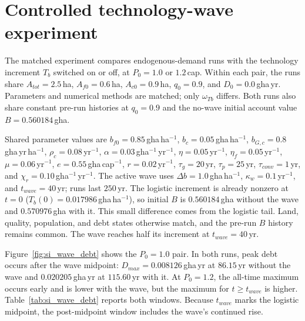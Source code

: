 \documentclass[11pt,a4paper]{article}
\begin{document}
\section{Controlled technology-wave experiment}\label{si:tbwave}

The matched experiment compares endogenous-demand runs with the technology increment $T_b$ switched on or off, at $P_0=1.0$ or $1.2$\,cap. Within each pair, the runs share $A_{tot}=2.5$\,ha, $A_{f0}=0.6$\,ha, $A_{c0}=0.9$\,ha, $q_0=0.9$, and $D_0=0.0$\,gha\,yr. Parameters and numerical methods are matched; only $\omega_{Tb}$ differs. Both runs also share constant pre-run histories at $q_0=0.9$ and the no-wave initial account value $B=0.560184$\,gha.

Shared parameter values are $b_{f0}=0.85$\,gha\,ha$^{-1}$, $b_c=0.05$\,gha\,ha$^{-1}$, $b_{G,c}=0.8$\,gha\,yr\,ha$^{-1}$, $\rho_c=0.08$\,yr$^{-1}$, $\alpha=0.03$\,gha$^{-1}$\,yr$^{-1}$, $\eta=0.05$\,yr$^{-1}$, $\eta_f=0.05$\,yr$^{-1}$, $\mu=0.06$\,yr$^{-1}$, $e=0.55$\,gha\,cap$^{-1}$, $r=0.02$\,yr$^{-1}$, $\tau_g=20$\,yr, $\tau_p=25$\,yr, $\tau_{conv}=1$\,yr, and $\chi_r=0.10$\,gha$^{-1}$\,yr$^{-1}$. The active wave uses $\Delta b=1.0$\,gha\,ha$^{-1}$, $\kappa_w=0.1$\,yr$^{-1}$, and $t_{wave}=40$\,yr; runs last $250$\,yr. The logistic increment is already nonzero at $t=0$ ($T_b(0)=0.017986$\,gha\,ha$^{-1}$), so initial $B$ is $0.560184$\,gha without the wave and $0.570976$\,gha with it. This small difference comes from the logistic tail. Land, quality, population, and debt states otherwise match, and the pre-run $B$ history remains common. The wave reaches half its increment at $t_{wave}=40$\,yr.

Figure~\ref{fig:si_wave_debt} shows the $P_0=1.0$ pair. In both runs, peak debt occurs after the wave midpoint: $D_{max}=0.008126$\,gha\,yr at $86.15$\,yr without the wave and $0.020205$\,gha\,yr at $115.60$\,yr with it. At $P_0=1.2$, the all-time maximum occurs early and is lower with the wave, but the maximum for $t\ge t_{wave}$ is higher. Table~\ref{tab:si_wave_debt} reports both windows. Because $t_{wave}$ marks the logistic midpoint, the post-midpoint window includes the wave's continued rise.
\end{document}
